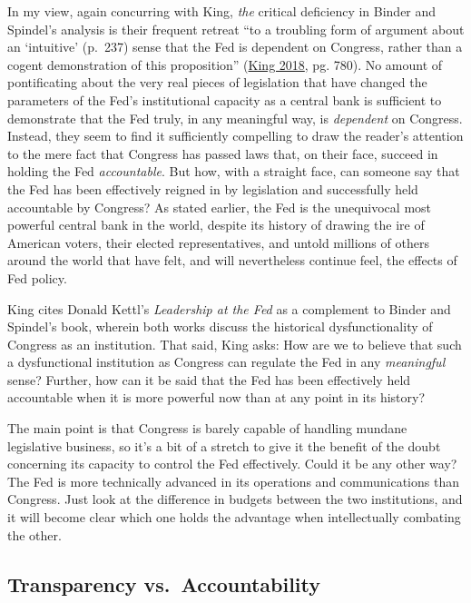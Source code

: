 \documentclass[
  11pt,
]{article}
\begin{document}
In my view, again concurring with King, \emph{the} critical deficiency
in Binder and Spindel's analysis is their frequent retreat ``to a
troubling form of argument about an `intuitive' (p.~237) sense that the
Fed is dependent on Congress, rather than a cogent demonstration of this
proposition'' (\protect\hyperlink{ref-king2018b}{King 2018}, pg. 780).
No amount of pontificating about the very real pieces of legislation
that have changed the parameters of the Fed's institutional capacity as
a central bank is sufficient to demonstrate that the Fed truly, in any
meaningful way, is \emph{dependent} on Congress. Instead, they seem to
find it sufficiently compelling to draw the reader's attention to the
mere fact that Congress has passed laws that, on their face, succeed in
holding the Fed \emph{accountable}. But how, with a straight face, can
someone say that the Fed has been effectively reigned in by legislation
and successfully held accountable by Congress? As stated earlier, the
Fed is the unequivocal most powerful central bank in the world, despite
its history of drawing the ire of American voters, their elected
representatives, and untold millions of others around the world that
have felt, and will nevertheless continue feel, the effects of Fed
policy.

King cites Donald Kettl's \emph{Leadership at the Fed} as a complement
to Binder and Spindel's book, wherein both works discuss the historical
dysfunctionality of Congress as an institution. That said, King asks:
How are we to believe that such a dysfunctional institution as Congress
can regulate the Fed in any \emph{meaningful} sense? Further, how can it
be said that the Fed has been effectively held accountable when it is
more powerful now than at any point in its history?

The main point is that Congress is barely capable of handling mundane
legislative business, so it's a bit of a stretch to give it the benefit
of the doubt concerning its capacity to control the Fed effectively.
Could it be any other way? The Fed is more technically advanced in its
operations and communications than Congress. Just look at the difference
in budgets between the two institutions, and it will become clear which
one holds the advantage when intellectually combating the other.

\hypertarget{transparency-vs.-accountability}{%
\subsection{Transparency
vs.~Accountability}\label{transparency-vs.-accountability}}
\end{document}
